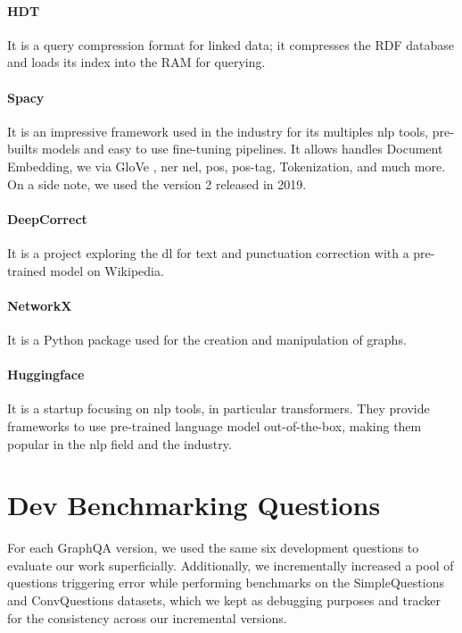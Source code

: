 \paragraph{HDT}
\autocite{website:hdt} It is a query compression format for linked data; it compresses the RDF database and loads its index into the RAM for querying. 

\paragraph{Spacy}
\autocite{paper:spacy2} It is an impressive framework used in the industry for its multiples \gls{nlp} tools, pre-builts models and easy to use fine-tuning pipelines. It allows handles Document Embedding, \gls{we} via GloVe \autocite{paper:glove}, \gls{ner} \gls{nel}, \gls{pos}, \gls{pos-tag}, Tokenization, and much more. On a side note, we used the version 2 released in 2019. 

\paragraph{DeepCorrect}
\autocite{website:deepcorrect-github} It is a project exploring the \gls{dl} for text and punctuation correction with a pre-trained model on Wikipedia.

\paragraph{NetworkX}
\autocite{paper:SciPyProceedings_11} It is a Python package used for the creation and manipulation of graphs.

\paragraph{Huggingface}
\autocite{paper:2019arXiv191003771W} It is a startup focusing on \gls{nlp} tools, in particular \glspl{transformer}. They provide frameworks to use pre-trained language model out-of-the-box, making them popular in the \gls{nlp} field and the industry.

\section{Dev Benchmarking Questions}
For each GraphQA version, we used the same six development questions to evaluate our work superficially. Additionally, we incrementally increased a pool of questions triggering error while performing benchmarks on the SimpleQuestions and ConvQuestions datasets, which we kept as debugging purposes and tracker for the consistency across our incremental versions.

